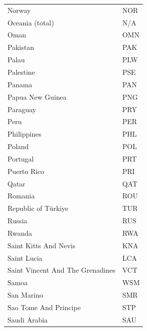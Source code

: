 \documentclass{report}
\begin{document}
\begin{center}
\begin{minipage}{0.46\textwidth}
\begin{tabular}{|p{10.5em}|p{6em}|}
            Norway & NOR\\
            Oceania (total) & N/A\\
            Oman & OMN\\
            Pakistan & PAK\\
            Palau & PLW\\
            Palestine & PSE\\
            Panama & PAN\\
            Papua New Guinea & PNG\\
            Paraguay & PRY\\
            Peru & PER\\
            Philippines & PHL\\
            Poland & POL\\
            Portugal & PRT\\
            Puerto Rico & PRI\\
            Qatar & QAT\\
            Romania & ROU\\
            Republic of Türkiye & TUR\\
            Russia & RUS\\
            Rwanda & RWA\\
            Saint Kitts And Nevis & KNA\\
            Saint Lucia & LCA\\
            Saint Vincent And The Grenadines & VCT\\
            Samoa & WSM\\
            San Marino & SMR\\
            Sao Tome And Principe & STP\\
            Saudi Arabia & SAU\\
            \hline
        \end{tabular}
    \end{minipage}


\end{center}
\end{document}
